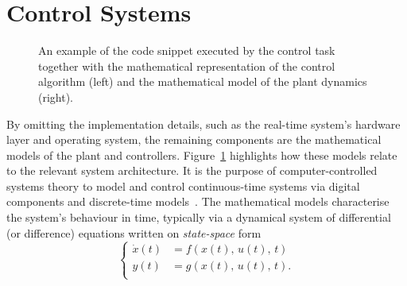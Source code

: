 \section{Control Systems}%
\label{sec:background:ctrl}%
%
\begin{figure}[t]
    \centering
    
    \caption{An example of the code snippet executed by the control task together with the mathematical representation of the control algorithm (left) and the mathematical model of the plant dynamics (right).}
    \label{fig:control-structure-abstraction}
\end{figure}
%
By omitting the implementation details, such as the real-time system's hardware layer and operating system, the remaining components are the mathematical models of the plant and controllers.
Figure~\ref{fig:control-structure-abstraction} highlights how these models relate to the relevant system architecture.
It is the purpose of computer-controlled systems theory to model and control continuous-time systems via digital components and discrete-time models~\cite{Astrom:1997}.
The mathematical models characterise the system's behaviour in time, typically via a dynamical system of differential (or difference) equations written on \emph{state-space} form
%
\begin{equation}%
    \label{eq:state-space}%
    \left\{\begin{aligned}
        \dot{x}(t) &= f(x(t),\, u(t),\, t) \\
        y(t) &= g(x(t),\, u(t),\, t). \\
    \end{aligned}\right.
\end{equation}

